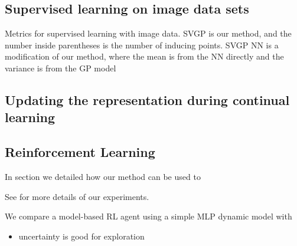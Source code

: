 \documentclass{article}
\newlength{\tblw}
\begin{document}
\subsection{Supervised learning on image data sets}


\begin{table}[t!] 
  \centering\scriptsize
  \caption{Metrics for supervised learning with image data. SVGP is our method, and the number inside parentheses is the number of inducing points. SVGP NN is a modification of our method, where the mean is from the NN directly and the variance is from the GP model} 
	\label{tbl:imagesuper}
	\renewcommand{\arraystretch}{1.}
	\setlength{\tabcolsep}{6pt}
	\setlength{\tblw}{0.2\textwidth}  
	
	\newcommand{\val}[2]{%
		$#1$\textcolor{gray}{\tiny ${\pm}#2$}
	} 

	
\end{table}
\subsection{Updating the representation during continual learning}

\begin{table}[t!] 
  \centering\scriptsize
  \caption{
  TODO: CL Experiments. $^*$ Methods relying only on weight regularization. 
  }
	\label{tbl:cl_table_1}
	\renewcommand{\arraystretch}{1.}
	\setlength{\tabcolsep}{2pt}
	\setlength{\tblw}{0.14\textwidth}  
	
	\newcommand{\val}[2]{%
		$#1$\textcolor{gray}{\tiny ${\pm}#2$}
	} 
	
	
\end{table}


\subsection{Reinforcement Learning}

In section \label{sec-rl} we detailed how our method can be used to

See \label{sec-rl-experiments-appendix} for more details of our experiments.



We compare a model-based RL agent using a simple MLP dynamic model with
\begin{itemize}
  \item uncertainty is good for exploration
\end{itemize}
\end{document}
